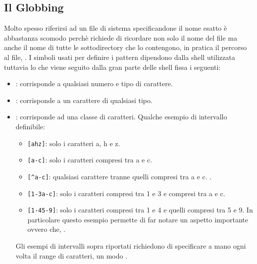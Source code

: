\subsection{Il Globbing}
\label{subsec:Il-Globbing}
Molto spesso riferirsi ad un file di sistema specificandone il nome esatto è abbastanza scomodo perchè richiede di ricordare non solo il nome del file ma anche il nome di tutte le sottodirectory che lo contengono, in pratica il percorso al file, . I simboli usati per definire i pattern dipendono dalla shell utilizzata tuttavia lo  che viene seguito dalla gran parte delle shell fissa i seguenti:
\begin{itemize}
    \item \tb{*}: corrisponde a qualsiasi numero e tipo di carattere.
    \item {}: corrisponde a un carattere di qualsiasi tipo.
    \item \tb{[]}: corrisponde ad una classe di caratteri. Qualche esempio di intervallo definibile:
    \begin{itemize}
        \item \verb|[ahz]|: solo i caratteri a, h e z.
        \item \verb|[a-c]|: solo i caratteri compresi tra a e c.
        \item \verb|[^a-c]|: qualsiasi carattere tranne quelli compresi tra a e c. .
        \item \verb|[1-3a-c]|: solo i caratteri compresi tra 1 e 3 e compresi tra a e c.
        \item \verb|[1-45-9]|: solo i caratteri compresi tra 1 e 4 e quelli compresi tra 5 e 9. In particolare questo esempio permette di far notare un aspetto importante ovvero che, .
    \end{itemize}
    Gli esempi di intervalli sopra riportati richiedono di specificare a mano ogni volta il range di caratteri, un modo .
\end{itemize}
